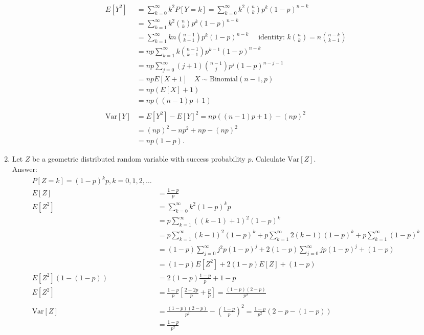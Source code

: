 \documentclass{article}
\begin{document}
\begin{enumerate}
\begin{align*}
E[Y^2] &= \sum_{k=0}^\infty k^2 P[Y = k] = \sum_{k=0}^\infty k^2 \binom{n}{k} p^k(1-p)^{n-k} \\
&= \sum_{k=1}^\infty k^2 \binom{n}{k} p^k(1-p)^{n-k} \\
&= \sum_{k=1}^\infty kn \binom{n-1}{k-1} p^k(1-p)^{n-k} \quad \text{ identity: }k\binom{n}{k} = n\binom{n-k}{k-1} \\
&= np \sum_{k=1}^\infty k \binom{n-1}{k-1}p^{k-1}(1-p)^{n-k} \\
&= np \sum_{j=0}^\infty (j+1)\binom{n-1}{j} p^j(1-p)^{n-j-1} \\
&= npE[X+1] \quad X \sim \text{Binomial}(n-1,p) \\
&= np(E[X]+ 1) \\
&= np((n-1)p + 1) \\
&\\
\text{Var}[Y] &= E[Y^2] - E[Y]^2 = np((n-1)p + 1) - (np)^2 \\
&= (np)^2 - np^2 + np - (np)^2 \\
&= np(1-p).
\end{align*}



\newpage
\item

Let $Z$ be a geometric distributed random variable with success probability $p$. Calculate $\text{Var}[Z]$. \\

Answer: 
\begin{align*}
P[Z = k] = (1-p)^kp, k = 0,1,2,\dots \\
E[Z] &= \frac{1-p}{p} \\
E[Z^2] &= \sum_{k=0}^\infty k^2(1-p)^kp \\
&= p \sum_{k=1}^\infty ((k-1) + 1)^2(1-p)^k \\
&= p \sum_{k=1}^\infty (k-1)^2(1-p)^k + p\sum_{k=1}^\infty 2(k-1)(1-p)^k + p \sum_{k=1}^\infty (1-p)^k \\
&= (1-p)\sum_{j=0}^\infty j^2p(1-p)^j + 2(1-p)\sum_{j=0}^\infty jp(1-p)^j + (1-p) \\
&= (1-p)E[Z^2] + 2(1-p)E[Z] + (1-p) \\
E[Z^2](1 - (1-p)) &= 2(1-p)\frac{1-p}{p} + 1-p \\
E[Z^2] &= \frac{1-p}{p}\left[\frac{2-2p}{p} + \frac{p}{p}\right] = \frac{(1-p)(2-p)}{p^2} \\
&\\
\text{Var}[Z] &= \frac{(1-p)(2-p)}{p^2} - \left(\frac{1-p}{p}\right)^2  = \frac{1-p}{p^2}(2-p-(1-p))\\
&= \boxed{\frac{1-p}{p^2}}
\end{align*}


\end{enumerate}
\end{document}
